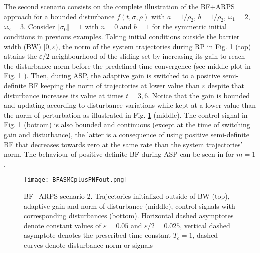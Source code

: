 \documentclass[twocolumn]{autart}    %
\begin{document}
{The second scenario consists on the complete illustration of the BF+ARPS approach for a bounded disturbance $f(t,\sigma,\rho)$ with $a=1/\rho_2$, $b=1/\rho_2$, $\omega_1=2$, $\omega_2=3$. Consider $\Vert \sigma_0 \Vert=1$ with $n=0$ and $b=1$ for the symmetric initial conditions in previous examples. Taking initial conditions outside the barrier width (BW) $[0,\varepsilon)$, the norm of the system trajectories during RP in Fig. \ref{fig:exp3_comp_outbar} (top) attains the $\varepsilon/2$ neighbourhood of the sliding set by increasing its gain to reach the disturbance norm before the predefined time convergence (see middle plot in Fig. \ref{fig:exp3_comp_outbar} ). Then,  during ASP, the adaptive gain is switched to a positive semi-definite BF keeping  the norm of trajectories  at lower value than $\varepsilon$ despite that disturbance increases its value at times $t=3,6$.  Notice that the gain is bounded and updating according to disturbance variations while kept at a lower value than the norm of perturbation as illustrated in Fig. \ref{fig:exp3_comp_outbar} (middle). The control signal in Fig. \ref{fig:exp3_comp_outbar} (bottom) is also bounded and continuous (except at the time of switching gain and disturbance), the latter is a consequence of using positive semi-definite BF that decreases towards zero at the same rate than the system trajectories' norm. The behaviour of positive definite BF during ASP can be seen in \cite{obeid18} for $m=1$.}
\begin{figure}
		\centering
		\texttt{[image: BFASMCplusPNFout.png]}
		\caption{BF+ARPS scenario 2. Trajectories initialized outside of BW (top),  adaptive gain and norm of disturbance (middle),  control signals with corresponding disturbances (bottom). Horizontal dashed asymptotes denote constant values of $\varepsilon=0.05$ and $\varepsilon/2=0.025$, vertical dashed asymptote denotes the prescribed time constant $T_c = 1$, dashed curves denote disturbance norm or signals}
		\label{fig:exp3_comp_outbar}
\end{figure}
\end{document}
